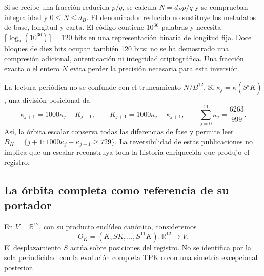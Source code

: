 Si se recibe una fracción reducida \(p/q\), se calcula
\(N=d_Bp/q\) y se comprueban integralidad y \(0\leq N\leq d_B\).
El denominador reducido no sustituye los metadatos de base, longitud y
carta. El código contiene \(10^{36}\) palabras y necesita
\(\lceil\log_2(10^{36})\rceil=120\) bits en una representación binaria
de longitud fija. Doce bloques de diez bits ocupan también 120 bits: no se
ha demostrado una compresión adicional, autenticación ni integridad
criptográfica. Una fracción exacta o el entero \(N\) evita perder la
precisión necesaria para esta inversión.

La lectura periódica no se confunde con el truncamiento \(N/B^{12}\).
Si \(\kappa_j=\kappa(S^jK)\), una división posicional da
\begin{equation}
 \kappa_{j+1}=1000\kappa_j-K_{j+1},\qquad
 K_{j+1}=1000\kappa_j-\kappa_{j+1},\qquad
 \sum_{j=0}^{11}\kappa_j=\frac{6263}{999}.
 \label{lib01:orbita-kappa}
\end{equation}
Así, la órbita escalar conserva todas las diferencias de fase y permite
leer \(B_K=\{j+1:1000\kappa_j-\kappa_{j+1}\geq729\}\).
La reversibilidad de estas publicaciones no implica que un escalar
reconstruya toda la historia enriquecida que produjo el registro.

\subsection{La órbita completa como referencia de su portador}
\label{lib01:orbita}

En \(V=\mathbb R^{12}\), con su producto euclídeo canónico, consideremos
\[
 O_K=(K,SK,\ldots,S^{11}K):\mathbb R^{12}\longrightarrow V.
\]
El desplazamiento \(S\) actúa sobre posiciones del registro. No se
identifica por la sola periodicidad con la evolución completa TPK o con
una simetría excepcional posterior.

